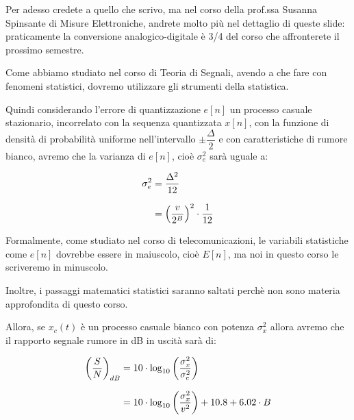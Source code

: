 \begin{tcolorbox}
    Per adesso credete a quello che scrivo, ma nel corso della prof.ssa Susanna Spinsante di Misure Elettroniche, andrete molto più nel dettaglio di queste slide: praticamente la conversione analogico-digitale è 3/4 del corso che affronterete il prossimo semestre. 
\end{tcolorbox}

\newpage  

Come abbiamo studiato nel corso di Teoria di Segnali, avendo a che fare con fenomeni statistici, dovremo utilizzare gli strumenti della statistica. \newline 

Quindi considerando l'errore di quantizzazione $e \left[ n\right]$ un processo casuale stazionario, incorrelato con la sequenza quantizzata $x \left[ n\right]$, 
con la funzione di densità di probabilità uniforme nell'intervallo $\pm \dfrac{\Delta}{2}$ e con caratteristiche di rumore bianco, 
avremo che la varianza di $e \left[ n\right]$, cioè $\sigma_{e}^{2}$ sarà uguale a: 

{
    \Large 
    \begin{equation}
        \setlength{\jot}{10pt} %
        \begin{split}
        \sigma_{e}^{2}
        &= 
        \dfrac{\Delta^{2}}{12} 
        \\
        &=
        \left(\dfrac{v}{2^{B}}\right)^{2}
        \cdot 
        \dfrac{1}{12}
        \end{split}
    \end{equation}
}

\begin{tcolorbox}
    Formalmente, come studiato nel corso di telecomunicazioni, le variabili statistiche come $e \left[ n\right]$ dovrebbe essere in maiuscolo, cioè $E \left[ n\right]$, 
    ma noi in questo corso le scriveremo in minuscolo. \newline 

    Inoltre, i passaggi matematici statistici saranno saltati perchè non sono materia approfondita di questo corso. 
\end{tcolorbox}

Allora, se $x_{c} \left(t\right) $ è un processo casuale bianco con potenza $\sigma_{x}^{2}$ allora avremo che il rapporto segnale rumore in dB in uscità sarà di: 

{
    \Large 
    \begin{equation}
        \setlength{\jot}{10pt} %
        \begin{split}
            \left(\dfrac{S}{N}\right)_{dB}
            &= 
            10 \cdot \log_{10} \left(\dfrac{\sigma_{x}^{2}}{\sigma_{e}^{2}}\right)
            \\
            &= 
            10 \cdot \log_{10} \left(\dfrac{\sigma_{x}^{2}}{v^{2}}\right)
            + 10.8 + 6.02 \cdot B
        \end{split}
    \end{equation}
}

